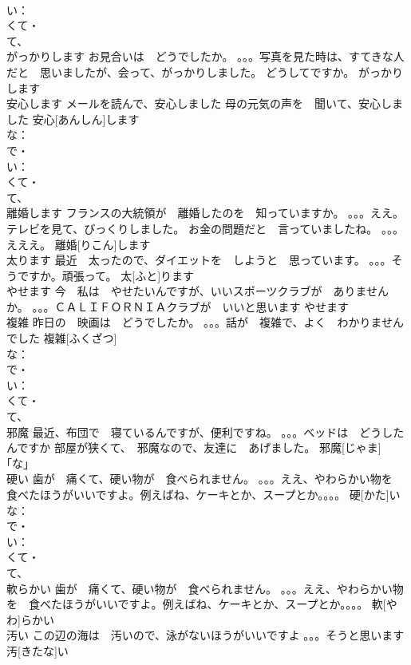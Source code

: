 \documentclass[8pt]{extreport}
\begin{document}
\begin{CJK}{UTF8}{min}
\\	い： 
\\	くて・
\\	て、
\\	がっかりします	お見合いは　どうでしたか。 。。。写真を見た時は、すてきな人だと　思いましたが、会って、がっかりしました。 どうしてですか。	がっかりします			
\\	安心します	メールを読んで、安心しました 母の元気の声を　聞いて、安心しました	安心[あんしん]します			
\\	な：
\\	で・
\\	い： 
\\	くて・
\\	て、
\\	離婚します	フランスの大統領が　離婚したのを　知っていますか。 。。。ええ。テレビを見て、びっくりしました。 お金の問題だと　言っていましたね。 。。。えええ。	離婚[りこん]します			
\\	太ります	最近　太ったので、ダイエットを　しようと　思っています。 。。。そうですか。頑張って。	太[ふと]ります			
\\	やせます	今　私は　やせたいんですが、いいスポーツクラブが　ありませんか。 。。。ＣＡＬＩＦＯＲＮＩＡクラブが　いいと思います	やせます			
\\	複雑	昨日の　映画は　どうでしたか。 。。。話が　複雑で、よく　わかりませんでした	複雑[ふくざつ]				
\\	な：
\\	で・
\\	い： 
\\	くて・
\\	て、
\\	邪魔	最近、布団で　寝ているんですが、便利ですね。 。。。ベッドは　どうしたんですか 部屋が狭くて、　邪魔なので、友達に　あげました。	邪魔[じゃま]			
\\	｢な｣	
\\	硬い	歯が　痛くて、硬い物が　食べられません。 。。。ええ、やわらかい物を　食べたほうがいいですよ。例えばね、ケーキとか、スープとか。。。。	硬[かた]い			
\\	な：
\\	で・
\\	い： 
\\	くて・
\\	て、
\\	軟らかい	歯が　痛くて、硬い物が　食べられません。 。。。ええ、やわらかい物を　食べたほうがいいですよ。例えばね、ケーキとか、スープとか。。。。	軟[やわ]らかい			
\\	汚い	この辺の海は　汚いので、泳がないほうがいいですよ 。。。そうと思います	汚[きたな]い			

\end{CJK}
\end{document}
